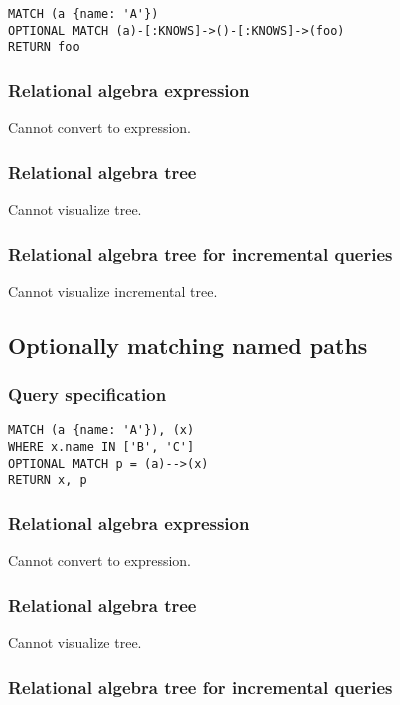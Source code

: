 \begin{lstlisting}
MATCH (a {name: 'A'})
OPTIONAL MATCH (a)-[:KNOWS]->()-[:KNOWS]->(foo)
RETURN foo
\end{lstlisting}

\subsubsection*{Relational algebra expression}

Cannot convert to expression.

\subsubsection*{Relational algebra tree}

Cannot visualize tree.

\subsubsection*{Relational algebra tree for incremental queries}

Cannot visualize incremental tree.

\subsection{Optionally matching named paths}

\subsubsection*{Query specification}

\begin{lstlisting}
MATCH (a {name: 'A'}), (x)
WHERE x.name IN ['B', 'C']
OPTIONAL MATCH p = (a)-->(x)
RETURN x, p
\end{lstlisting}

\subsubsection*{Relational algebra expression}

Cannot convert to expression.

\subsubsection*{Relational algebra tree}

Cannot visualize tree.

\subsubsection*{Relational algebra tree for incremental queries}

